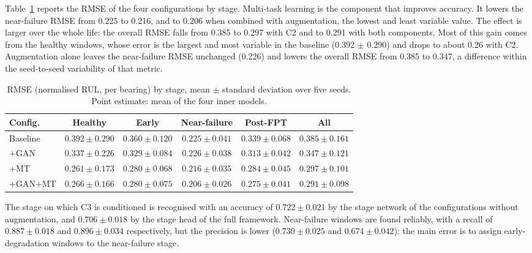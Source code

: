 \documentclass[review]{elsarticle}
\begin{document}
Table~\ref{tab:rmse} reports the RMSE of the four configurations by
stage. Multi-task learning is the component that improves accuracy.
It lowers the near-failure RMSE from 0.225 to 0.216, and to 0.206 when
combined with augmentation, the lowest and least variable value. The
effect is larger over the whole life: the overall RMSE falls from 0.385
to 0.297 with C2 and to 0.291 with both components. Most of this gain
comes from the healthy windows, whose error is the largest and most
variable in the baseline (0.392 $\pm$ 0.290) and drops to about 0.26
with C2. Augmentation alone leaves the near-failure RMSE unchanged
(0.226) and lowers the overall RMSE from 0.385 to 0.347, a difference
within the seed-to-seed variability of that metric.

\begin{table}[htbp]
\centering
\caption{RMSE (normalised RUL, per bearing) by stage, mean $\pm$
standard deviation over five seeds. Point estimate: mean of the four
inner models.}
\label{tab:rmse}
\footnotesize
\renewcommand{\arraystretch}{1.2}
\setlength{\tabcolsep}{4pt}
\begin{tabular}{lccccc}
\toprule
\textbf{Config.} & \textbf{Healthy} & \textbf{Early} &
\textbf{Near-failure} & \textbf{Post-FPT} & \textbf{All} \\
\midrule
Baseline & $0.392 \pm 0.290$ & $0.360 \pm 0.120$ & $0.225 \pm 0.041$ & $0.339 \pm 0.068$ & $0.385 \pm 0.161$ \\
+GAN     & $0.337 \pm 0.226$ & $0.329 \pm 0.084$ & $0.226 \pm 0.038$ & $0.313 \pm 0.042$ & $0.347 \pm 0.121$ \\
+MT      & $0.261 \pm 0.173$ & $0.280 \pm 0.068$ & $0.216 \pm 0.035$ & $0.284 \pm 0.045$ & $0.297 \pm 0.101$ \\
+GAN+MT  & $0.266 \pm 0.166$ & $0.280 \pm 0.075$ & $\mathbf{0.206 \pm 0.026}$ & $\mathbf{0.275 \pm 0.041}$ & $\mathbf{0.291 \pm 0.098}$ \\
\bottomrule
\end{tabular}
\end{table}

The stage on which C3 is conditioned is recognised with an accuracy of
$0.722 \pm 0.021$ by the stage network of the configurations without
augmentation, and $0.706 \pm 0.018$ by the stage head of the full
framework. Near-failure windows are found reliably, with a recall of
$0.887 \pm 0.018$ and $0.896 \pm 0.034$ respectively, but the
precision is lower ($0.730 \pm 0.025$ and $0.674 \pm 0.042$): the
main error is to assign early-degradation windows to the near-failure
stage.
\end{document}
